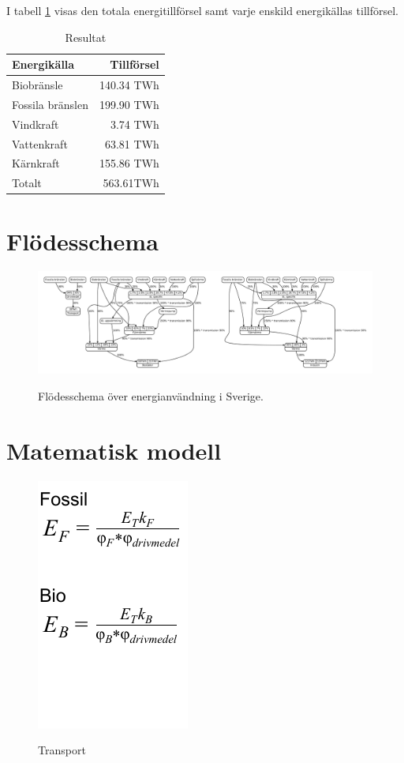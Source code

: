 \documentclass[a4paper,11pt,fleqn, titlepage]{article}
\begin{document}
I tabell \ref{resultat} visas den totala energitillförsel samt varje
enskild energikällas tillförsel.
\begin{table}[h!]
	\centering
	\begin{tabular}{| l | r |}
		\hline
		Energikälla      & Tillförsel \\ \hline
		Biobränsle       & 140.34 TWh \\
		Fossila bränslen & 199.90 TWh \\
		Vindkraft        & 3.74 TWh \\
		Vattenkraft      & 63.81 TWh \\
		Kärnkraft        & 155.86 TWh \\ \hline
		Totalt           & 563.61TWh \\ \hline
	\end{tabular}
	\caption{Resultat}
	\label{resultat}
\end{table}


\newpage
\appendix

\section{Flödesschema}
\begin{figure}[h!]
	\centering 
	\vspace*{-3cm}
	\includegraphics[width=0.8\paperheight,angle=270]{diagram.pdf}
	\label{app:schema}
	\caption{Flödesschema över energianvändning i Sverige.}
\end{figure}


\section {Matematisk modell} \label{app:math}
\begin{figure}[!h]
	\centering 
 		\includegraphics[scale = 0.75]{transport2.pdf}
		\label{diagram2}
		\caption{Transport}
\end{figure}
\newpage
\end{document}
